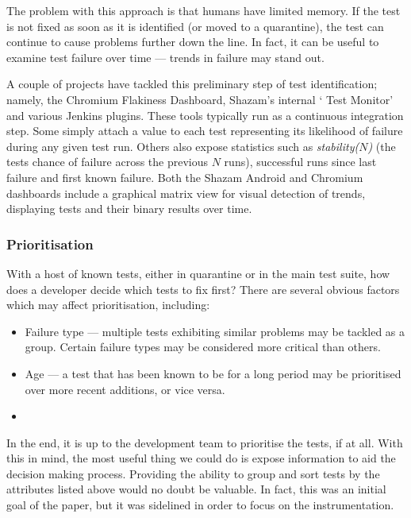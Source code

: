 The problem with this approach is that humans have limited memory. If the \flaky{} test is not fixed as soon as it is identified (or moved to a quarantine), the test can continue to cause problems further down the line. In fact, it can be useful to examine test failure over time --- trends in failure may stand out.

A couple of projects have tackled this preliminary step of \flaky{} test identification; namely, the Chromium Flakiness Dashboard\cite{flakinessDashboard}, Shazam’s internal {\lq}\flaky{} Test Monitor{\rq} and various Jenkins plugins. These tools typically run as a continuous integration step. Some simply attach a value to each test representing its likelihood of failure during any given test run. Others also expose statistics such as \emph{stability($N$)} (the tests chance of failure across the previous $N$ runs), successful runs since last failure and first known failure. Both the Shazam Android and Chromium dashboards include a graphical matrix view for visual detection of trends, displaying tests and their binary results over time.

\subsubsection{Prioritisation}

With a host of known \flaky{} tests, either in quarantine or in the main test suite, how does a developer decide which tests to fix first? There are several obvious factors which may affect prioritisation, including:
\begin{itemize}
	\item Failure type --- multiple \flaky{} tests exhibiting similar problems may be tackled as a group. Certain failure types may be considered more critical than others.
	\item Age --- a \flaky{} test that has been known to be \flaky{} for a long period may be prioritised over more recent additions, or vice versa.
	\item {}
\end{itemize}

In the end, it is up to the development team to prioritise the \flaky{} tests, if at all. With this in mind, the most useful thing we could do is expose information to aid the decision making process. Providing the ability to group and sort \flaky{} tests by the attributes listed above would no doubt be valuable. In fact, this was an initial goal of the paper, but it was sidelined in order to focus on the instrumentation.

